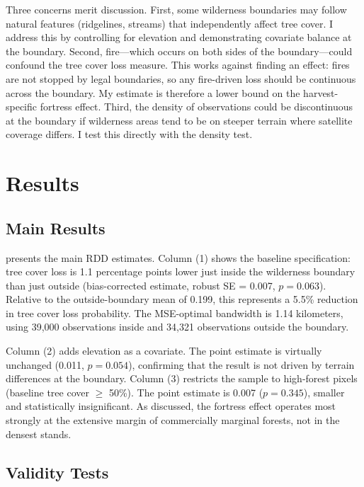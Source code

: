 \documentclass[12pt]{article}
\begin{document}
Three concerns merit discussion. First, some wilderness boundaries may follow natural features (ridgelines, streams) that independently affect tree cover. I address this by controlling for elevation and demonstrating covariate balance at the boundary. Second, fire---which occurs on both sides of the boundary---could confound the tree cover loss measure. This works against finding an effect: fires are not stopped by legal boundaries, so any fire-driven loss should be continuous across the boundary. My estimate is therefore a lower bound on the harvest-specific fortress effect. Third, the density of observations could be discontinuous at the boundary if wilderness areas tend to be on steeper terrain where satellite coverage differs. I test this directly with the \citet{CattaneoEtAl2020density} density test.


\section{Results}

\subsection{Main Results}

 presents the main RDD estimates. Column (1) shows the baseline specification: tree cover loss is 1.1 percentage points lower just inside the wilderness boundary than just outside (bias-corrected estimate, robust SE = 0.007, $p = 0.063$). Relative to the outside-boundary mean of 0.199, this represents a 5.5\% reduction in tree cover loss probability. The MSE-optimal bandwidth is 1.14 kilometers, using 39,000 observations inside and 34,321 observations outside the boundary.

Column (2) adds elevation as a covariate. The point estimate is virtually unchanged (0.011, $p = 0.054$), confirming that the result is not driven by terrain differences at the boundary. Column (3) restricts the sample to high-forest pixels (baseline tree cover $\geq$ 50\%). The point estimate is 0.007 ($p = 0.345$), smaller and statistically insignificant. As discussed, the fortress effect operates most strongly at the extensive margin of commercially marginal forests, not in the densest stands.



\subsection{Validity Tests}
\end{document}
